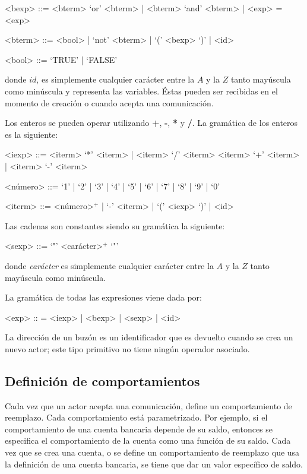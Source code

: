 \begin{grammar}

<bexp> ::= <bterm> `or' <bterm> | <bterm> `and' <bterm> | <exp> = <exp>
  
<bterm> ::= <bool> | `not' <bterm> | `(' <bexp> `)' | <id>

<bool> ::= `TRUE' | `FALSE'

\end{grammar}
donde $id$, es simplemente cualquier carácter entre la $A$ y la $Z$ tanto mayúscula como minúscula y representa las variables. Éstas pueden ser recibidas en el momento de creación o cuando acepta una comunicación.

Los enteros se pueden operar utilizando \textbf{+}, \textbf{-}, \textbf{*} y \textbf{/}. La gramática de los enteros es la siguiente:
\begin{grammar}

<iexp> ::= <iterm> `*' <iterm> | <iterm> `/' <iterm> 
\alt <iterm> `+' <iterm>  | <iterm> `-' <iterm>

<número> ::= `1' | `2' | `3' | `4' | `5' | `6' | `7' | `8' | `9' | `0'

<iterm> ::= <número>$^{+}$ | `-' <iterm> | `(' <iexp> `)' | <id> 

\end{grammar}
Las cadenas son constantes siendo su gramática la siguiente:
\begin{grammar}
 <sexp> ::= `"' <carácter>$^{+}$ `"'
\end{grammar}
donde \textit{carácter} es simplemente cualquier carácter entre la $A$ y la $Z$ tanto mayúscula como minúscula.

La gramática de todas las expresiones viene dada por:
\begin{grammar}
<exp> :: = <iexp> | <bexp> | <sexp> | <id>  
\end{grammar}

La dirección de un buzón es un identificador que es devuelto cuando se crea un nuevo actor; este tipo primitivo no tiene ningún operador asociado. 

\subsection{Definición de comportamientos}\label{actores:beha}

Cada vez que un actor acepta una comunicación, define un comportamiento de reemplazo. Cada comportamiento está parametrizado. Por ejemplo, si el comportamiento de una cuenta bancaria depende de su saldo, entonces se especifica el comportamiento de la cuenta como una función de su saldo. Cada vez que se crea una cuenta, o se define un comportamiento de reemplazo que usa la definición de una cuenta bancaria, se tiene que dar un valor específico de saldo.

